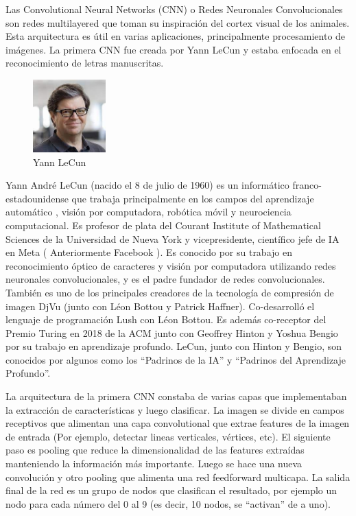 \documentclass[a4paper]{article}
\begin{document}
Las Convolutional Neural Networks (CNN) o Redes Neuronales Convolucionales 
son redes multilayered que toman 
su inspiración del cortex visual de los animales. Esta 
arquitectura es útil en varias aplicaciones, principalmente 
procesamiento de imágenes. La primera CNN fue creada por Yann 
LeCun y estaba enfocada en el reconocimiento de letras 
manuscritas.

\begin{figure} %
    \centering
    \includegraphics[width=0.25\textwidth]{./images/Yann_LeCun.jpeg}
    \caption{Yann LeCun}
\end{figure}

Yann André LeCun (nacido el 8 de julio de 1960) es un informático 
franco-estadounidense que trabaja principalmente en los campos del 
aprendizaje automático , visión por computadora, robótica móvil y 
neurociencia computacional. Es profesor de plata del Courant 
Institute of Mathematical Sciences de la Universidad de Nueva York 
y vicepresidente, científico jefe de IA en Meta ( Anteriormente 
Facebook )\cite{wikiyann}.
\newpage
Es conocido por su trabajo en reconocimiento óptico de caracteres 
y visión por computadora utilizando redes neuronales 
convolucionales, y es el padre fundador de redes 
convolucionales. También es uno de los principales creadores de la 
tecnología de compresión de imagen DjVu (junto con Léon Bottou y 
Patrick Haffner). Co-desarrolló el lenguaje de programación Lush 
con Léon Bottou. Es además co-receptor del Premio Turing en 2018 de la ACM junto con 
Geoffrey Hinton y Yoshua Bengio por su trabajo en aprendizaje 
profundo. LeCun, junto con Hinton y Bengio, son conocidos por algunos como 
los ``Padrinos de la IA'' y ``Padrinos del Aprendizaje Profundo''. 

La arquitectura de la primera CNN constaba de varias capas que 
implementaban la extracción de características y luego clasificar. 
La imagen se divide en campos receptivos que alimentan una capa 
convolutional que extrae features de la imagen de entrada (Por 
ejemplo, detectar lineas verticales, vértices, etc). El siguiente 
paso es pooling que reduce la dimensionalidad de las features 
extraídas manteniendo la información más importante. Luego se hace 
una nueva convolución y otro pooling que alimenta una red 
feedforward multicapa. La salida final de la red es un grupo de 
nodos que clasifican el resultado, por ejemplo un nodo para cada 
número del 0 al 9 (es decir, 10 nodos, se ``activan'' de a uno).
\end{document}

